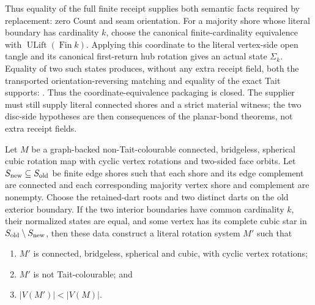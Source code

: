 Thus equality of the full finite receipt supplies both semantic facts required
by replacement: zero Count and seam orientation.  For a majority shore whose
literal boundary has cardinality \(k\), choose the canonical finite-cardinality
equivalence with \(\operatorname{ULift}(\operatorname{Fin} k)\).  Applying this
coordinate to the literal vertex-side open tangle and its canonical
first-return hub rotation gives an actual state \(\Sigma_k\).  Equality of two
such states produces, without any extra receipt field, both the transported
orientation-reversing matching and equality of the exact Tait supports:
.
Thus the coordinate-equivalence packaging is closed.  The supplier must still
supply literal connected shores and a strict material witness; the two
disc-side hypotheses are then consequences of the planar-bond theorems, not
extra receipt fields.

\begin{theorem}
\label{thm:constructive-majority-shore-physical-replacement}
Let \(M\) be a graph-backed non-Tait-colourable connected, bridgeless,
spherical cubic rotation map with cyclic vertex rotations and two-sided face
orbits.  Let \(S_{\rm new}\subseteq S_{\rm old}\) be finite edge shores such
that each shore and its edge complement are connected and each corresponding
majority vertex shore and complement are nonempty.  Choose the retained-dart
roots and two distinct darts on the old exterior boundary.  If the two
interior boundaries have common cardinality \(k\), their normalized states
are equal, and some vertex has its complete cubic star in
\(S_{\rm old}\setminus S_{\rm new}\), then these data construct a literal
rotation system \(M'\) such that
\begin{enumerate}
\item \(M'\) is connected, bridgeless, spherical and cubic, with cyclic
      vertex rotations;
\item \(M'\) is not Tait-colourable; and
\item \(\lvert V(M')\rvert<\lvert V(M)\rvert\).
\end{enumerate}
\end{theorem}

